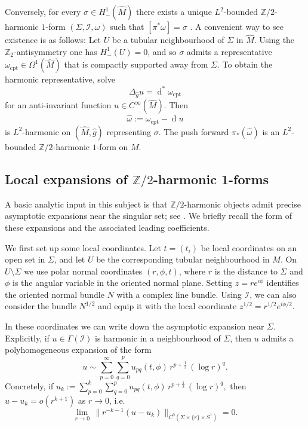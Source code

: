 \documentclass[11pt]{amsart}
\newcommand{\ZT}{\mathbb{Z}/2}
\renewcommand{\d}{\operatorname{d}}
\begin{document}
Conversely, for every $\sigma\in H^1_-(\widehat M)$ there exists a unique $L^2$-bounded $\ZT$-harmonic
$1$-form $(\Sigma,\mathcal I,\omega)$ such that $[\pi^\ast\omega]=\sigma$
\cite{Donaldson2021,Hunsicker2005}. A convenient way to see existence is as follows: Let $U$ be a tubular neighbourhood of $\Sigma$ in $\widehat M$. Using the $\mathbb{Z}_2$-antisymmetry one has $H^1_-(U)=0$, and
so $\sigma$ admits a representative $\omega_{\mathrm{cpt}}\in\Omega^1(\widehat M)$ that is compactly
supported away from $\Sigma$. To obtain the harmonic representative, solve
\begin{equation}
	\label{eq:background:defining-equation-z2-on-double-cover}
	\Delta_{\hat g} u = \d^\ast \omega_{\mathrm{cpt}}
\end{equation}
for an anti-invariant function $u\in C^\infty(\widehat M)$. Then
\[
\widehat\omega := \omega_{\mathrm{cpt}} - \d u
\]
is $L^2$-harmonic on $(\widehat M,\hat g)$ representing $\sigma$. 
The push forward $\pi_*(\hat{\omega})$ is an $L^2$-bounded $\ZT$-harmonic $1$-form on $M$.

\subsection{Local expansions of \texorpdfstring{$\ZT$}{Z/2}-harmonic 1-forms}
\label{sec:background:local-expansions}
A basic analytic input in this subject is that $\ZT$-harmonic objects admit precise asymptotic
expansions near the singular set; see
\cite{BeraWalpuski2025Dirac, Donaldson2021,MazzeoHaydysTakahashi,Mazzeo1991}.
We briefly recall the form of these expansions and the associated leading coefficients.

We first set up some local coordinates.
Let $t=(t_i)$ be local coordinates on an open set in $\Sigma$, and let $U$ be the corresponding
tubular neighbourhood in $M$. On $U\setminus\Sigma$ we use polar normal coordinates
$(r,\phi,t)$, where $r$ is the distance to $\Sigma$ and $\phi$ is the angular variable in the
oriented normal plane. Setting $z=re^{i\phi}$ identifies the oriented normal bundle $N$ with a
complex line bundle. Using $\mathcal{I}$, we can also consider the bundle $N^{1/2}$ and equip it with the local coordinate $z^{1/2}=r^{1/2}e^{i\phi/2}$.

In these coordinates we can write down the asymptotic expansion near $\Sigma$.
Explicitly, if $u\in \Gamma(\mathcal I)$ is harmonic in a neighbourhood of $\Sigma$, then $u$ admits a
polyhomogeneous expansion of the form
\[
u \sim \sum_{p=0}^\infty \sum_{q=0}^p u_{pq}(t,\phi)\, r^{p+\frac12}\,(\log r)^q.
\]
Concretely, if
\(
u_k := \sum_{p=0}^{k} \sum_{q=0}^p u_{pq}(t,\phi)\, r^{p+\frac12}\,(\log r)^q,
\)
then $u-u_k=o(r^{k+1})$ as $r\to 0$, i.e.
\[
\lim_{r\to 0}\, \bigl\|r^{-k-1}(u-u_k)\bigr\|_{C^0(\Sigma\times\{r\}\times S^1)}=0.
\]
\end{document}
